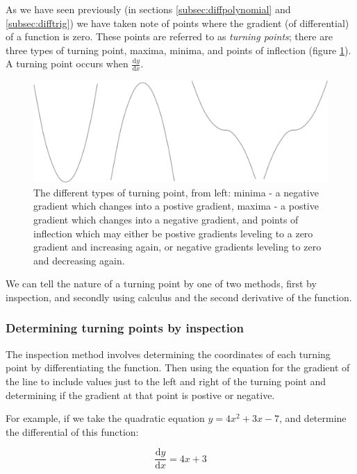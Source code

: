 \documentclass[
]{book}
\begin{document}
As we have seen previously (in sections \ref{subsec:diffpolynomial} and \ref{subsec:difftrig}) we have taken note of points where the gradient (of differential) of a function is zero. These points are referred to as \emph{turning points}; there are three types of turning point, maxima, minima, and points of inflection (figure \ref{fig:turningpoints}). A turning point occurs when \(\frac{\textrm{d}y}{\textrm{d}x}\).

\begin{figure}

{\centering \includegraphics[width=0.6\linewidth]{images/turningpoints} 

}

\caption{The different types of turning point, from left: minima - a negative gradient which changes into a postive gradient, maxima - a postive gradient which changes into a negative gradient, and points of inflection which may either be postive gradients leveling to a zero gradient and increasing again, or negative gradients leveling to zero and decreasing again.}\label{fig:turningpoints}
\end{figure}

We can tell the nature of a turning point by one of two methods, first by inspection, and secondly using calculus and the second derivative of the function.

\hypertarget{determining-turning-points-by-inspection}{%
\subsubsection{Determining turning points by inspection}\label{determining-turning-points-by-inspection}}

The inspection method involves determining the coordinates of each turning point by differentiating the function. Then using the equation for the gradient of the line to include values just to the left and right of the turning point and determining if the gradient at that point is postive or negative.

For example, if we take the quadratic equation \(y=4x^2+3x-7\), and determine the differential of this function:

\begin{equation*}
\frac{\textrm{d}y}{\textrm{d}x} = 4x+3
\end{equation*}
\end{document}
